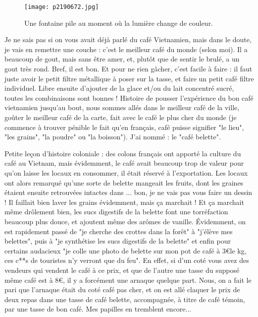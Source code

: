 \documentclass{book}
\begin{document}
\begin{figure}[h]
\centering
\texttt{[image: p2190672.jpg]}
\caption*{Une fontaine pile au moment où la lumière change de couleur.}
\end{figure}

Je ne sais pas si on vous avait déjà parlé du café Vietnamien, mais dans le doute, je vais en remettre une couche : c'est le meilleur café du monde (selon moi). Il a beaucoup de gout, mais sans être amer, et, plutôt que de sentir le brulé, a un gout très rond. Bref, il est bon. Et pour ne rien gâcher, c'est facile à faire : il faut juste avoir le petit filtre métallique à poser sur la tasse, et faire un petit café filtre individuel. Libre ensuite d'ajouter de la glace et/ou du lait concentré sucré, toutes les combinaisons sont bonnes ! Histoire de pousser l'expérience du bon café vietnamien jusqu'au bout, nous sommes allés dans le meilleur café de la ville, goûter le meilleur café de la carte, fait avec le café le plus cher du monde (je commence à trouver pénible le fait qu'en français, café puisse signifier "le lieu", "les grains", "la poudre" ou "la boisson"). J'ai nommé : le "café belette".

Petite leçon d'histoire coloniale : des colons français ont apporté la culture du café au Vietnam, mais évidemment, le café avait beaucoup trop de valeur pour qu'on laisse les locaux en consommer, il était réservé à l'exportation. Les locaux ont alors remarqué qu'une sorte de belette mangeait les fruits, dont les graines étaient ensuite retrouvées intactes dans ... bon, je ne vais pas vous faire un dessin ! Il faillait bien laver les grains évidemment, mais ça marchait ! Et ça marchait même drôlement bien, les sucs digestifs de la belette font une torréfaction beaucoup plus douce, et ajoutent même des arômes de vanille. Évidemment, on est rapidement passé de "je cherche des crottes dans la forêt" à "j'élève mes belettes", puis à "je synthétise les sucs digestifs de la belette" et enfin pour certains audacieux "je colle une photo de belette sur mon pot de café à 3\euro le kg, ces c**s de touristes n'y verront que du feu". En effet, si d'un coté vous avez des vendeurs qui vendent le café à ce prix, et que de l'autre une tasse du supposé même café est à 8\euro, il y a forcément une arnaque quelque part. Nous, on a fait le pari que l'arnaque était du coté café pas cher, et on est allé claquer le prix de deux repas dans une tasse de café belette, accompagnée, à titre de café témoin, par une tasse de bon café. Mes papilles en tremblent encore...
\end{document}
